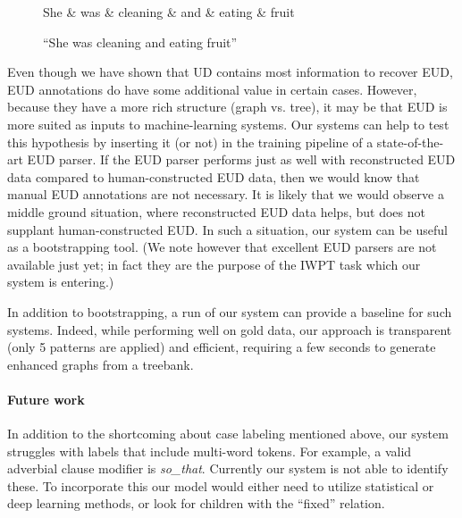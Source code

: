 \documentclass[11pt,a4paper]{article}
\begin{document}
\begin{itemize}
\begin{figure}[h]
    \centering
    \begin{dependency}
    \begin{deptext}[column sep=0.1cm]
    She \& was \& cleaning \& and \& eating \& fruit  \\
    \end{deptext}
    \end{dependency}
    \caption{``She was cleaning and eating fruit''}
    \label{fig:conj-obj}
\end{figure}
 

\end{itemize}

Even though we have shown that UD contains most information to recover
EUD, EUD annotations do have some additional value in certain
cases. However, because they have a more rich structure (graph
vs. tree), it may be that EUD is more suited as inputs to
machine-learning systems. Our systems can help to test this hypothesis
by inserting it (or not) in the training pipeline of a state-of-the-art EUD
parser. If the EUD parser performs just as well with reconstructed EUD
data compared to human-constructed EUD data, then we would know that
manual EUD annotations are not necessary.  It is likely that we would observe
a middle ground situation, where reconstructed EUD data helps, but
does not supplant human-constructed EUD. In such a situation, our
system can be useful as a bootstrapping tool. (We note however that
excellent EUD parsers are not available just yet; in fact they are the
purpose of the IWPT task which our system is entering.)

In addition to bootstrapping, a run of our system can provide a
baseline for such systems.  Indeed, while performing well on gold
data, our approach is transparent (only 5 patterns are applied) and
efficient, requiring a few seconds to generate enhanced graphs from a
treebank. 

\paragraph{ Future work }

In addition to the shortcoming about case labeling mentioned
above, our system struggles with labels that include multi-word
tokens. For example, a valid adverbial clause modifier is
\textit{so\_that}. Currently our system is not able to identify
these. To incorporate this our model would either need to utilize
statistical or deep learning methods, or look for children with
the ``fixed'' relation.
    
\end{document}
